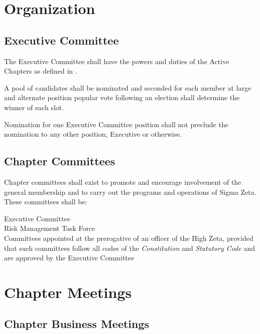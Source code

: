 \documentclass{article}
\begin{document}
\section{Organization}

\subsection{Executive Committee}

The Executive Committee shall have the powers and duties of the Active Chapters
as defined in .

\begin{subsubsectionList}
  \item A pool of candidates shall be nominated and seconded for each member at
  large and alternate position popular vote following an election shall
  determine the winner of each slot.

  \item Nomination for one Executive Committee position shall not preclude the
  nomination to any other position, Executive or otherwise.
\end{subsubsectionList}

\subsection{Chapter Committees}

Chapter committees shall exist to promote and encourage involvement of the
general membership and to carry out the programs and operations of Sigma Zeta.
These committees shall be:

Executive Committee\\
Risk Management Task Force \\
Committees appointed at the prerogative of an officer of the High Zeta, provided
that such committees follow all codes of the \emph{Constitution} and
\emph{Statutory Code} and are approved by the Executive Committee

\section{Chapter Meetings}

\subsection{Chapter Business Meetings}
\end{document}
